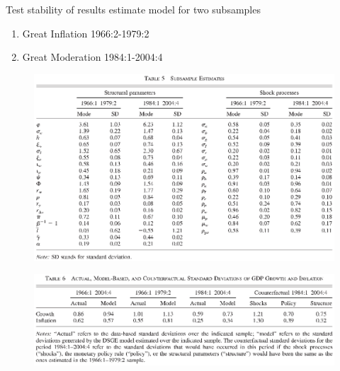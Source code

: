 \documentclass{beamer}
\begin{document}
\begin{frame}
  Test stability of results estimate model for two subsamples
  \begin{enumerate}
    \item Great Inflation 1966:2-1979:2 
    \item Great Moderation 1984:1-2004:4 
  \end{enumerate}
\end{frame}

\begin{frame}
  \begin{figure}
    \includegraphics[scale=.7]{sw_table5.eps}
  \end{figure}
\end{frame}

\begin{frame}
  \begin{figure}
    \includegraphics[scale=.7]{sw_table6.eps}
  \end{figure}
\end{frame}

\end{document}
